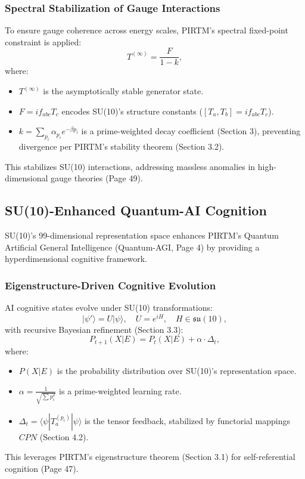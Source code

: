 \documentclass{article}
\theoremstyle{plain}
\begin{document}
\subsubsection{Spectral Stabilization of Gauge Interactions}
To ensure gauge coherence across energy scales, PIRTM’s spectral fixed-point constraint is applied:
\[
T^{(\infty)} = \frac{F}{1 - k},
\]
where:
\begin{itemize}
    \item \( T^{(\infty)} \) is the asymptotically stable generator state.
    \item \( F = i f_{abc} T_c \) encodes SU(10)’s structure constants (\( [T_a, T_b] = i f_{abc} T_c \)).
    \item \( k = \sum_{p_i} \alpha_{p_i} e^{-\beta p_i} \) is a prime-weighted decay coefficient (Section 3), preventing divergence per PIRTM’s stability theorem (Section 3.2).
\end{itemize}
This stabilizes SU(10) interactions, addressing massless anomalies in high-dimensional gauge theories (Page 49).

\subsection{SU(10)-Enhanced Quantum-AI Cognition}

SU(10)’s 99-dimensional representation space enhances PIRTM’s Quantum Artificial General Intelligence (Quantum-AGI, Page 4) by providing a hyperdimensional cognitive framework.

\subsubsection{Eigenstructure-Driven Cognitive Evolution}
AI cognitive states evolve under SU(10) transformations:
\[
|\psi'\rangle = U |\psi\rangle, \quad U = e^{i H}, \quad H \in \mathfrak{su}(10),
\]
with recursive Bayesian refinement (Section 3.3):
\[
P_{t+1}(X|E) = P_t(X|E) + \alpha \cdot \Delta_t,
\]
where:
\begin{itemize}
    \item \( P(X|E) \) is the probability distribution over SU(10)’s representation space.
    \item \( \alpha = \frac{1}{\sqrt{\sum p_i^2}} \) is a prime-weighted learning rate.
    \item \( \Delta_t = \langle \psi | T_a^{(p_i)} | \psi \rangle \) is the tensor feedback, stabilized by functorial mappings \( CPN \) (Section 4.2).
\end{itemize}
This leverages PIRTM’s eigenstructure theorem (Section 3.1) for self-referential cognition (Page 47).
\end{document}
